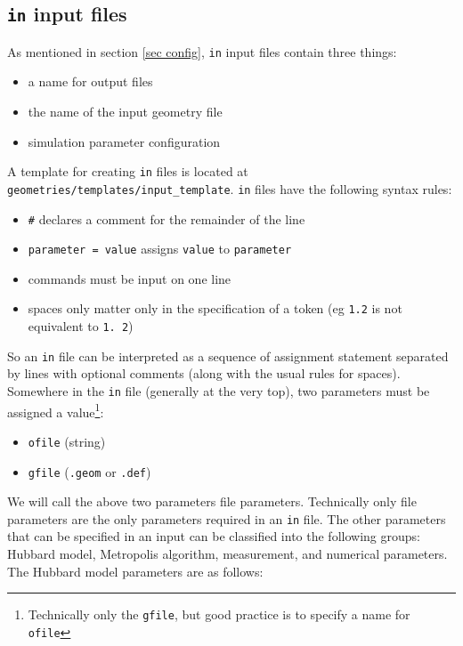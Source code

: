 \documentclass[12pt]{article}
\begin{document}
        \subsection{\texttt{in} input files}
        As mentioned in section \ref{sec config}, \texttt{in} input files contain three things:
        \begin{itemize}
            \item a name for output files
            \item the name of the input geometry file
            \item simulation parameter configuration
        \end{itemize}
        A template for creating \texttt{in} files is located at \texttt{geometries/templates/input\_template}.
        \texttt{in} files have the following syntax rules:
        \begin{itemize}
            \item \texttt{\#} declares a comment for the remainder of the line
            \item \texttt{parameter = value} assigns \texttt{value} to \texttt{parameter}
            \item commands must be input on one line
            \item spaces only matter only in the specification of a token (eg \texttt{1.2} is not equivalent to \texttt{1. 2})
        \end{itemize}
        So an \texttt{in} file can be interpreted as a sequence of assignment statement separated by lines with optional comments (along with the usual rules for spaces).
        Somewhere in the \texttt{in} file (generally at the very top), two parameters must be assigned a value\footnote{Technically only the \texttt{gfile}, but good practice is to specify a name for \texttt{ofile}}:
        \begin{itemize}
            \item \texttt{ofile} (string)
            \item \texttt{gfile} (\texttt{.geom} or \texttt{.def})
        \end{itemize}
        We will call the above two parameters file parameters.
        Technically only file parameters are the only parameters required in an \texttt{in} file.
        The other parameters that can be specified in an input can be classified into the following groups: Hubbard model, Metropolis algorithm, measurement, and numerical parameters.
        The Hubbard model parameters are as follows:
\end{document}
